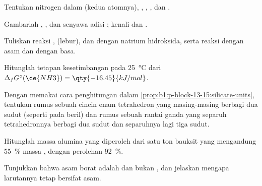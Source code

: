 \begin{exercise}[$\star$]\label{exo:b1:p-block-13-15:1}
Tentukan  nitrogen dalam  (kedua atomnya),
, , , dan .
\end{exercise}

\begin{exercise}[$\star$]\label{exo:b1:p-block-13-15:2}
Gambarlah  , , dan senyawa adisi
; kenali  dan .
\end{exercise}

\begin{exercise}[$\star$]\label{exo:b1:p-block-13-15:3}
Tuliskan reaksi ,  (lebur), dan  dengan
natrium hidroksida, serta reaksi  dengan asam dan dengan basa.
\end{exercise}

\begin{exercise}[$\star$]\label{exo:b1:p-block-13-15:4}
Hitunglah tetapan kesetimbangan  pada
\qty{25}{\celsius} dari $\Delta_f G^\circ(\ce{NH3}) =
\qty{-16.45}{kJ/mol}$.
\end{exercise}

\begin{exercise}[$\star\star$]\label{exo:b1:p-block-13-15:5}
Dengan memakai cara penghitungan dalam \cref{prop:b1:p-block-13-15:silicate-units},
tentukan rumus sebuah cincin enam tetrahedron yang masing-masing berbagi
dua sudut (seperti pada beril) dan rumus sebuah rantai ganda yang
separuh tetrahedronnya berbagi dua sudut dan separuhnya lagi tiga sudut.
\end{exercise}

\begin{exercise}[$\star\star$]\label{exo:b1:p-block-13-15:6}
Hitunglah massa alumina yang diperoleh dari satu ton bauksit yang
mengandung \qty{55}{\percent} massa , dengan perolehan
\qty{92}{\percent}.
\end{exercise}

\begin{exercise}[$\star\star$]\label{exo:b1:p-block-13-15:7}
Tunjukkan bahwa asam borat adalah  dan bukan , dan
jelaskan mengapa larutannya tetap bersifat asam.
\end{exercise}


